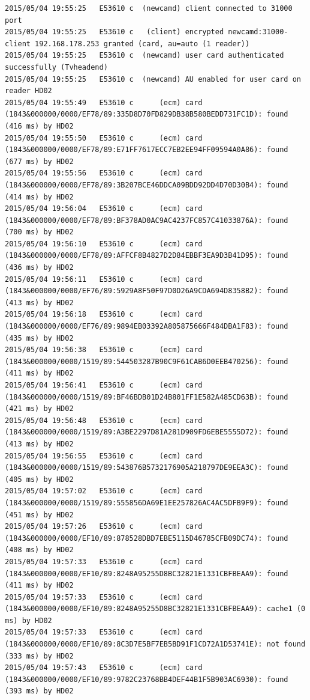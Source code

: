 \begin{cmd}[H]
\begin{Verbatim}[fontsize=\tiny]
2015/05/04 19:55:25   E53610 c  (newcamd) client connected to 31000 port
2015/05/04 19:55:25   E53610 c   (client) encrypted newcamd:31000-client 192.168.178.253 granted (card, au=auto (1 reader))
2015/05/04 19:55:25   E53610 c  (newcamd) user card authenticated successfully (Tvheadend)
2015/05/04 19:55:25   E53610 c  (newcamd) AU enabled for user card on reader HD02
2015/05/04 19:55:49   E53610 c      (ecm) card (1843&000000/0000/EF78/89:335D8D70FD829DB38B580BEDD731FC1D): found (416 ms) by HD02
2015/05/04 19:55:50   E53610 c      (ecm) card (1843&000000/0000/EF78/89:E71FF7617ECC7EB2EE94FF09594A0A86): found (677 ms) by HD02
2015/05/04 19:55:56   E53610 c      (ecm) card (1843&000000/0000/EF78/89:3B207BCE46DDCA09BDD92DD4D70D30B4): found (414 ms) by HD02
2015/05/04 19:56:04   E53610 c      (ecm) card (1843&000000/0000/EF78/89:BF378AD0AC9AC4237FC857C41033876A): found (700 ms) by HD02
2015/05/04 19:56:10   E53610 c      (ecm) card (1843&000000/0000/EF78/89:AFFCF8B4827D2D84EBBF3EA9D3B41D95): found (436 ms) by HD02
2015/05/04 19:56:11   E53610 c      (ecm) card (1843&000000/0000/EF76/89:5929A8F50F97D0D26A9CDA694D8358B2): found (413 ms) by HD02
2015/05/04 19:56:18   E53610 c      (ecm) card (1843&000000/0000/EF76/89:9894EB03392A805875666F484DBA1F83): found (435 ms) by HD02
2015/05/04 19:56:38   E53610 c      (ecm) card (1843&000000/0000/1519/89:544503287B90C9F61CAB6D0EEB470256): found (411 ms) by HD02
2015/05/04 19:56:41   E53610 c      (ecm) card (1843&000000/0000/1519/89:BF46BDB01D24B801FF1E582A485CD63B): found (421 ms) by HD02
2015/05/04 19:56:48   E53610 c      (ecm) card (1843&000000/0000/1519/89:A3BE2297D81A281D909FD6EBE5555D72): found (413 ms) by HD02
2015/05/04 19:56:55   E53610 c      (ecm) card (1843&000000/0000/1519/89:543876B5732176905A218797DE9EEA3C): found (405 ms) by HD02
2015/05/04 19:57:02   E53610 c      (ecm) card (1843&000000/0000/1519/89:555856DA69E1EE257826AC4AC5DFB9F9): found (451 ms) by HD02
2015/05/04 19:57:26   E53610 c      (ecm) card (1843&000000/0000/EF10/89:878528DBD7EBE5115D46785CFB09DC74): found (408 ms) by HD02
2015/05/04 19:57:33   E53610 c      (ecm) card (1843&000000/0000/EF10/89:8248A95255D8BC32821E1331CBFBEAA9): found (411 ms) by HD02
2015/05/04 19:57:33   E53610 c      (ecm) card (1843&000000/0000/EF10/89:8248A95255D8BC32821E1331CBFBEAA9): cache1 (0 ms) by HD02
2015/05/04 19:57:33   E53610 c      (ecm) card (1843&000000/0000/EF10/89:8C3D7E5BF7EB5BD91F1CD72A1D53741E): not found (333 ms) by HD02
2015/05/04 19:57:43   E53610 c      (ecm) card (1843&000000/0000/EF10/89:9782C23768BB4DEF44B1F5B903AC6930): found (393 ms) by HD02

\end{Verbatim}
\end{cmd}
